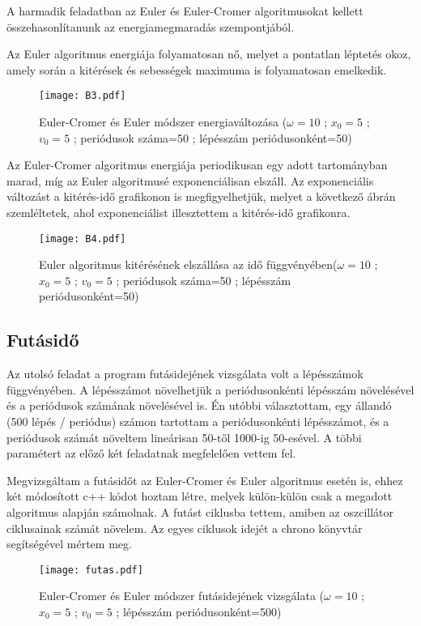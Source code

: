 \documentclass[a4paper,12pt]{article}
\begin{document}
A harmadik feladatban az Euler és Euler-Cromer algoritmusokat kellett összehasonlítanunk az energiamegmaradás szempontjából.

Az Euler algoritmus energiája folyamatosan nő, melyet a pontatlan léptetés okoz, amely során a kitérések és sebességek maximuma is folyamatosan emelkedik.

\newpage

\begin{figure}[ht!]
\centering
\texttt{[image: B3.pdf]}
\caption{Euler-Cromer és Euler módszer energiaváltozása ($\omega=10$ ; $x_0=5$ ; $v_0=5$ ; periódusok száma=50 ; lépésszám periódusonként=50)}
\end{figure}

Az Euler-Cromer algoritmus energiája periodikusan egy adott tartományban marad, míg az Euler algoritmusé exponenciálisan elszáll.
Az exponenciális változást a kitérés-idő grafikonon is megfigyelhetjük, melyet a következő ábrán szemléltetek, ahol exponenciálist illesztettem a kitérés-idő grafikonra.

\begin{figure}[ht!]
\centering
\texttt{[image: B4.pdf]}
\caption{Euler algoritmus kitérésének elszállása az idő függvényében($\omega=10$ ; $x_0=5$ ; $v_0=5$ ; periódusok száma=50 ; lépésszám periódusonként=50)}
\end{figure}

\subsection{Futásidő}

Az utolsó feladat a program futásidejének vizsgálata volt a lépésszámok függvényében. A lépésszámot növelhetjük a periódusonkénti lépésszám növelésével és a periódusok számának növelésével is. Én utóbbi választottam, egy állandó (500 lépés / periódus) számon tartottam a periódusonkénti lépésszámot, és a periódusok számát növeltem lineárisan 50-től 1000-ig 50-esével. A többi paramétert az előző két feladatnak megfelelően vettem fel.

Megvizsgáltam a futásidőt az Euler-Cromer és Euler algoritmus esetén is, ehhez két módosított c++ kódot hoztam létre, melyek külön-külön csak a megadott algoritmus alapján számolnak. A futást ciklusba tettem, amiben az oszcillátor ciklusainak számát növelem. Az egyes ciklusok idejét a chrono könyvtár segítségével mértem meg.

\begin{figure}[ht!]
\centering
\texttt{[image: futas.pdf]}
\caption{Euler-Cromer és Euler módszer futásidejének vizsgálata ($\omega=10$ ; $x_0=5$ ; $v_0=5$ ; lépésszám periódusonként=500)}
\end{figure}
\end{document}
